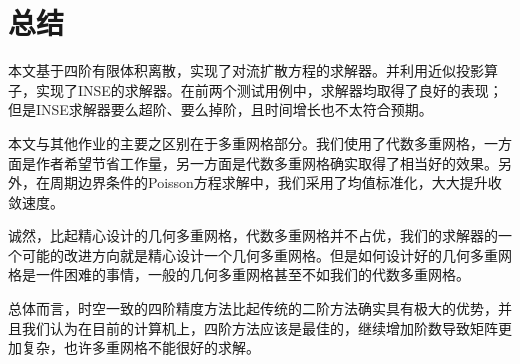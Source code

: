\documentclass[lang=cn,10pt,bibend=bibtex]{elegantbook}
\begin{document}
\vspace{5em}

\chapter{总结}

本文基于四阶有限体积离散，实现了对流扩散方程的求解器。并利用近似投影算子，实现了INSE的求解器。在前两个测试用例中，求解器均取得了良好的表现；但是INSE求解器要么超阶、要么掉阶，且时间增长也不太符合预期。

本文与其他作业的主要之区别在于多重网格部分。我们使用了代数多重网格，一方面是作者希望节省工作量，另一方面是代数多重网格确实取得了相当好的效果。另外，在周期边界条件的Poisson方程求解中，我们采用了均值标准化，大大提升收敛速度。

诚然，比起精心设计的几何多重网格，代数多重网格并不占优，我们的求解器的一个可能的改进方向就是精心设计一个几何多重网格。但是如何设计好的几何多重网格是一件困难的事情，一般的几何多重网格甚至不如我们的代数多重网格。

总体而言，时空一致的四阶精度方法比起传统的二阶方法确实具有极大的优势，并且我们认为在目前的计算机上，四阶方法应该是最佳的，继续增加阶数导致矩阵更加复杂，也许多重网格不能很好的求解。

\vspace{5em}

\printbibliography[heading=bibintoc,title=\ebibname]
\end{document}
